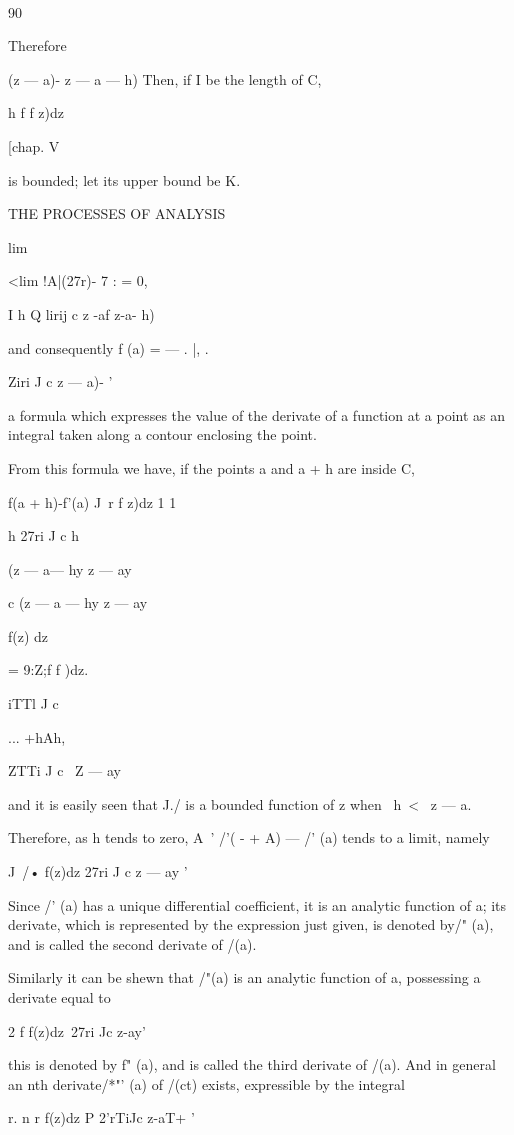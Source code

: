 {{\

90

Therefore

(z — a)- z — a — h) Then, if I be the length of C,

h f f z)dz

[chap. V

is bounded; let its upper bound be K.

THE PROCESSES OF ANALYSIS

lim

<lim !A|(27r)- 7 : = 0,

I h Q lirij c z -af z-a- h)

and consequently f (a) = — . |, .

   Ziri J c z — a)- '

a formula which expresses the value of the derivate of a function at a
point as an integral taken along a contour enclosing the point.

From this formula we have, if the points a and a + h are inside C,

f(a + h)-f'(a) J\ r f z)dz 1 1

h 27ri J c h

(z — a— hy z — ay

c (z — a — hy z — ay

f(z) dz

= 9:Z;f f )dz.

iTTl J c

... +hAh,

ZTTi J c \ Z — ay

and it is easily seen that J./ is a bounded function of z when \ h\ <
\ z — a.

Therefore, as h tends to zero, A~' /'( - + A) — /' (a) tends to a
limit, namely

J\ /• f(z)dz 27ri J c z — ay '

Since /' (a) has a unique differential coefficient, it is an analytic
function of a; its derivate, which is represented by the expression
just given, is denoted by/" (a), and is called the second derivate of
/(a).

Similarly it can be shewn that /"(a) is an analytic function of a,
possessing a derivate equal to

2 f f(z)dz\ 27ri Jc z-ay'

this is denoted by f" (a), and is called the third derivate of /(a).
And in general an nth derivate/*"' (a) of /(ct) exists, expressible by
the integral

r. n r f(z)dz P 2'rTiJc z-aT+ '

}}
